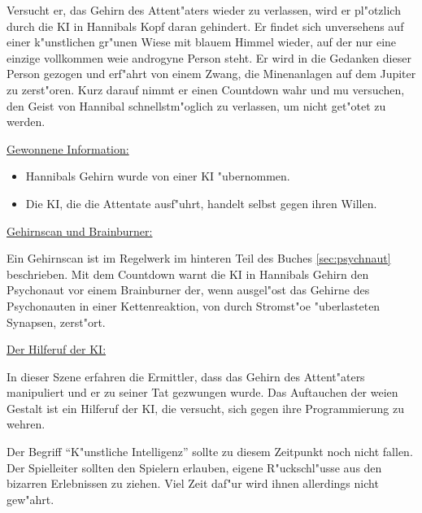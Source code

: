 Versucht er, das Gehirn des Attent"aters wieder zu verlassen, wird er pl"otzlich durch die KI in Hannibals Kopf daran gehindert. Er findet sich unversehens auf einer k"unstlichen gr"unen Wiese mit blauem Himmel wieder, auf der nur eine einzige vollkommen wei\3e androgyne Person steht. Er wird in die Gedanken dieser Person gezogen und erf"ahrt von einem Zwang, die Minenanlagen auf dem Jupiter zu zerst"oren. Kurz darauf nimmt er einen Countdown wahr und mu\3 versuchen, den Geist von Hannibal schnellstm"oglich zu verlassen, um nicht get"otet zu werden.

\begin{remarks}
	\underline{Gewonnene Information:}

	\begin{itemize}
		\item Hannibals Gehirn wurde von einer KI "ubernommen.
		\item  Die KI, die die Attentate ausf"uhrt, handelt selbst gegen ihren Willen.
	\end{itemize}

	\underline{Gehirnscan und Brainburner:}

	Ein Gehirnscan ist im Regelwerk im hinteren Teil des Buches \cref{sec:psychnaut} beschrieben. Mit dem Countdown warnt die KI in Hannibals Gehirn den Psychonaut vor einem Brainburner der, wenn ausgel"ost das Gehirne des Psychonauten in einer Kettenreaktion, von durch Stromst"o\3e "uberlasteten Synapsen, zerst"ort.

	\underline{Der Hilferuf der KI:}

	In dieser Szene erfahren die Ermittler, dass das Gehirn des Attent"aters manipuliert und er zu seiner Tat gezwungen wurde. Das Auftauchen der wei\3en Gestalt ist ein Hilferuf der KI, die versucht, sich gegen ihre Programmierung zu wehren. 
	
	Der Begriff ``K"unstliche Intelligenz'' sollte zu diesem Zeitpunkt noch nicht fallen. Der Spielleiter sollten den Spielern erlauben, eigene R"uckschl"usse aus den bizarren Erlebnissen zu ziehen. Viel Zeit daf"ur wird ihnen allerdings nicht gew"ahrt.
\end{remarks}

